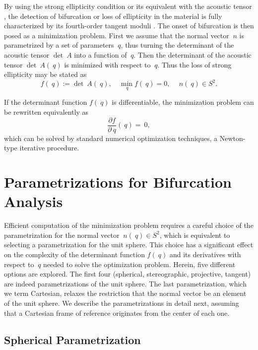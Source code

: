 \documentclass[12pt]{article}
\numberwithin{equation}{section}
\begin{document}
By using the strong ellipticity condition
 or its equivalent with the acoustic
tensor , the detection of bifurcation
or loss of ellipticity in the material is fully characterized by its
fourth-order tangent moduli . The
onset of bifurcation is then posed as a minimization problem.  First
we assume that the normal vector $~n$ is parametrized by a set of
parameters $~q$, thus turning the determinant of the acoustic tensor
$\det ~A$ into a function of $~q$.  Then the determinant of the
acoustic tensor $\det ~A(~q)$ is minimized with respect to
$~q$. Thus the loss of strong ellipticity may be stated as
\begin{equation} \label{eq:minimization-determinant}
  f(~q) := \det ~A(~q),
  \quad
  \min_{~q} f(~q) = 0,
  \quad
  ~n(~q) \in S^2.
\end{equation}

If the determinant function $f(~q)$ is differentiable, the
minimization problem can be rewritten equivalently as
\begin{equation}\label{eq:minimization-derivative}
  \frac{\partial f}{\partial ~q}(~q) = ~0,
\end{equation}
which can be solved by standard numerical optimization techniques, \eg
a Newton-type iterative procedure.

\section{Parametrizations for Bifurcation Analysis}
\label{sec:parametrizations}

Efficient computation of the minimization problem
 requires a careful choice of the
parametrization for the normal vector $~n(~q) \in S^2$, which is
equivalent to selecting a parametrization for the unit sphere. This
choice has a significant effect on the complexity of the determinant
function $f(~q)$ and its derivatives with respect to $~q$ needed to
solve the optimization problem. Herein, five different options are
explored. The first four (spherical, stereographic, projective,
tangent) are indeed parametrizations of the unit sphere.  The last
parametrization, which we term Cartesian, relaxes the restriction that
the normal vector be an element of the unit sphere. We describe the
parametrizations in detail next, assuming that a Cartesian frame of
reference originates from the center of each one.

\subsection{Spherical Parametrization}
\label{subsec:spherical}
\end{document}

